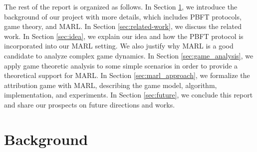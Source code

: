 \documentclass[a4paper,11pt]{article}
\begin{document}
The rest of the report is organized as follows.
In Section \ref{sec:bg}, we introduce the background of our project with more details, which includes PBFT protocols, game theory, and MARL.
In Section \ref{sec:related-work}, we discuss the related work.
In Section \ref{sec:idea}, we explain our idea and how the PBFT protocol is incorporated into our MARL setting. We also justify why MARL is a good candidate to analyze complex game dynamics.
In Section \ref{sec:game_analysis}, we apply game theoretic analysis to some simple scenarios in order to provide a theoretical support for MARL.
In Section \ref{sec:marl_approach}, we formalize the attribution game with MARL, describing the game model, algorithm, implementation, and experiments.
In Section \ref{sec:future}, we conclude this report and share our prospects on future directions and works.


\section{Background}\label{sec:bg}
\end{document}
